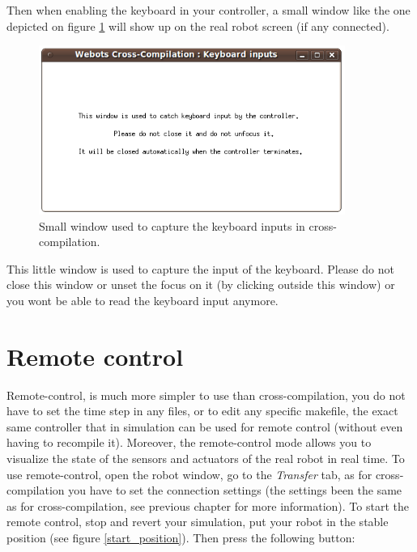 \documentclass[a4paper, 12pt]{article}  		%
\begin{document}
Then when enabling the keyboard in your controller, a small window like the one depicted on figure \ref{keyboardWindow} will show up on the real robot screen (if any connected).\\

\begin{figure}[H]
\begin{center}
\includegraphics[width=10cm]{keyboardWindow.png}
\caption{Small window used to capture the keyboard inputs in cross-compilation.}
\label{keyboardWindow}
\end{center}
\end{figure}

This little window is used to capture the input of the keyboard. Please do not close this window or unset the focus on it (by clicking outside this window) or you wont be able to read the keyboard input anymore.\\


\newpage
\section{Remote control}

Remote-control, is much more simpler to use than cross-compilation, you do not have to set the time step in any files, or to edit any specific makefile, the exact same controller that in simulation can be used for remote control (without even having to recompile it). Moreover, the remote-control mode allows you to visualize the state of the sensors and actuators of the real robot in real time. To use remote-control, open the robot window, go to the \textit{Transfer} tab, as for cross-compilation you have to set the connection settings (the settings been the same as for cross-compilation, see previous chapter for more information). To start the remote control, stop and revert your simulation, put your robot in the stable position (see figure \ref{start_position}). Then press the following button:\\
\end{document}

